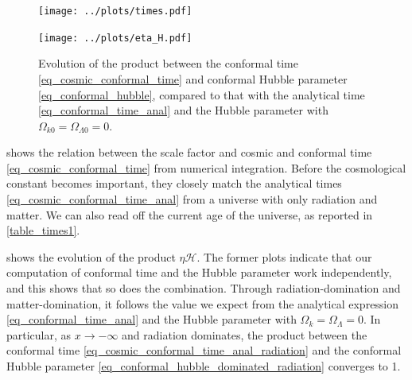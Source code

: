 \documentclass[10pt,a4paper]{article}
\begin{document}
\begin{figure}
	\centering
	\texttt{[image: ../plots/times.pdf]}
	\caption{%
		Evolution of numerically integrated cosmic and conformal times \eqref{eq_cosmic_conformal_time} in the Planck 2018 cosmology \eqref{eq_planck2018},
		compared to the analytical expressions \eqref{eq_cosmic_conformal_time_anal} in a universe with no cosmological constant.
	}
	\label{fig_cosmic_conformal_time}

	\bigskip

	\texttt{[image: ../plots/eta\_H.pdf]}
	\caption{%
		Evolution of the product between the conformal time \eqref{eq_cosmic_conformal_time} and conformal Hubble parameter \eqref{eq_conformal_hubble},
		compared to that with the analytical time \eqref{eq_conformal_time_anal} and the Hubble parameter with $\Omega_{k0}=\Omega_{\Lambda0}=0$.
	}
	\label{fig_eta_H}
\end{figure}

 shows the relation between the scale factor and cosmic and conformal time \eqref{eq_cosmic_conformal_time} from numerical integration.
Before the cosmological constant becomes important, they closely match the analytical times \eqref{eq_cosmic_conformal_time_anal} from a universe with only radiation and matter.
We can also read off the current age of the universe, as reported in \cref{table_times1}.

 shows the evolution of the product $\eta \mathcal{H}$.
The former plots indicate that our computation of conformal time and the Hubble parameter work independently,
and this shows that so does the combination.
Through radiation-domination and matter-domination,
it follows the value we expect from the analytical expression \eqref{eq_conformal_time_anal}
and the Hubble parameter with $\Omega_{k} = \Omega_\Lambda = 0$.
In particular, as $x \rightarrow -\infty$ and radiation dominates,
the product between the conformal time \eqref{eq_cosmic_conformal_time_anal_radiation}
and the conformal Hubble parameter \eqref{eq_conformal_hubble_dominated_radiation} converges to 1.
\end{document}
